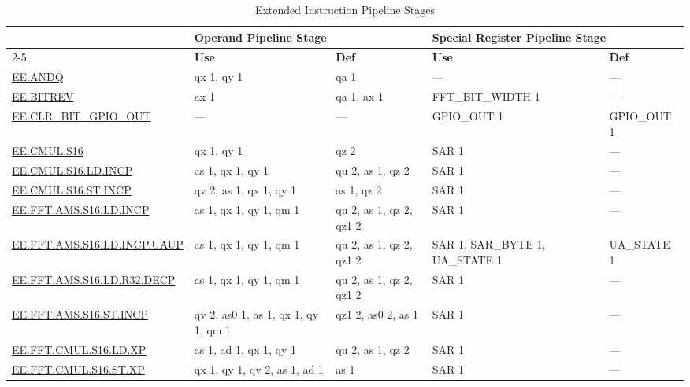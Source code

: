 
\begin{longtable}[c]{|l|m{2.5cm}|m{2.5cm}|m{2.5cm}|m{2.5cm}|}
    \caption{Extended Instruction Pipeline Stages}
    \label{tab:pie_inst_pipelining}\\
    \hline
    \rowcolor{lightgray}
     & \multicolumn{2}{l|}{\textbf{Operand Pipeline Stage}} & \multicolumn{2}{l|}{\textbf{Special Register Pipeline Stage}} \\\cline{2-5}
    \rowcolor{lightgray}
    \multirow{-2}{1in}{\textbf{Instruction}} & \textbf{Use} & \textbf{Def} & \textbf{Use} & \textbf{Def} \\\hline
    \hyperref[instruction:EEANDQ]{EE.ANDQ} & qx 1, qy 1 & qa 1 & — & — \\\hline
    \hyperref[instruction:EEBITREV]{EE.BITREV} & ax 1 & qa 1, ax 1 & FFT\_BIT\_WIDTH 1 & — \\\hline
    \hyperref[instruction:EECLRBITGPIOOUT]{EE.CLR\_BIT\_GPIO\_OUT} & — & — & GPIO\_OUT 1 & GPIO\_OUT 1 \\\hline
    \hyperref[instruction:EECMULS16]{EE.CMUL.S16} & qx 1, qy 1 & qz 2 & SAR 1 & — \\\hline
    \hyperref[instruction:EECMULS16LDINCP]{EE.CMUL.S16.LD.INCP} & as 1, qx 1, qy 1 & qu 2, as 1, qz 2 & SAR 1 & — \\\hline
    \hyperref[instruction:EECMULS16STINCP]{EE.CMUL.S16.ST.INCP} & qv 2, as 1, qx 1, qy 1 & as 1, qz 2 & SAR 1 & — \\\hline
    \hyperref[instruction:EEFFTAMSS16LDINCP]{EE.FFT.AMS.S16.LD.INCP} & as 1, qx 1, qy 1, qm 1 & qu 2, as 1, qz 2, qz1 2 & SAR 1 & — \\\hline
    \hyperref[instruction:EEFFTAMSS16LDINCPUAUP]{EE.FFT.AMS.S16.LD.INCP.UAUP} & as 1, qx 1, qy 1, qm 1 & qu 2, as 1, qz 2, qz1 2 & SAR 1, SAR\_BYTE 1, UA\_STATE 1 & UA\_STATE 1\\\hline
    \hyperref[instruction:EEFFTAMSS16LDR32DECP]{EE.FFT.AMS.S16.LD.R32.DECP} & as 1, qx 1, qy 1, qm 1 & qu 2, as 1, qz 2, qz1 2 & SAR 1 & — \\\hline
    \hyperref[instruction:EEFFTAMSS16STINCP]{EE.FFT.AMS.S16.ST.INCP} & qv 2, as0 1, as 1, qx 1, qy 1, qm 1 & qz1 2, as0 2, as 1 & SAR 1 & — \\\hline
    \hyperref[instruction:EEFFTCMULS16LDXP]{EE.FFT.CMUL.S16.LD.XP} & as 1, ad 1, qx 1, qy 1 & qu 2, as 1, qz 2 & SAR 1 & — \\\hline
    \hyperref[instruction:EEFFTCMULS16STXP]{EE.FFT.CMUL.S16.ST.XP} & qx 1, qy 1, qv 2, as 1, ad 1 & as 1 & SAR 1 & — \\\hline

\end{longtable}
